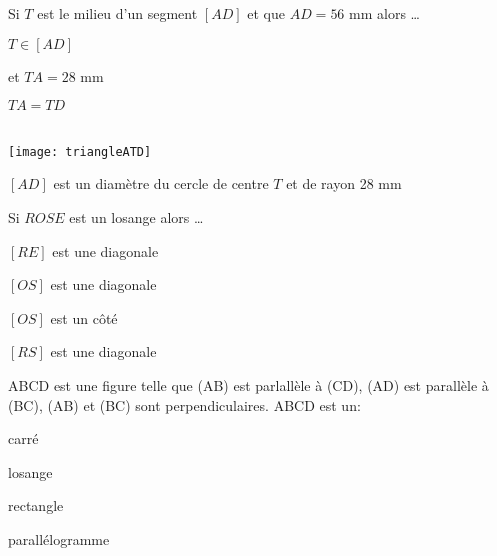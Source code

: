 

\begin{QCM}
  \begin{GroupeQCM}
    \begin{exercice}
      Si $T$ est le milieu d'un segment $[AD]$ et que $AD = 56$ mm alors \ldots
      \begin{ChoixQCM}{4}
      \item $T \in [AD]$
      
      et $TA = 28$ mm
      \item $TA = TD$
      \item \\[-1em]
      \texttt{[image: triangleATD]}
      \item $[AD]$ est un diamètre du cercle de centre $T$ et de rayon 28 mm
      \end{ChoixQCM}
\begin{corrige}
   \end{corrige}
    \end{exercice}

  \begin{exercice}
      Si $ROSE$ est un losange alors \ldots
      \begin{ChoixQCM}{4}
      \item $[RE]$ est une diagonale
      \item $[OS]$ est une diagonale
      \item $[OS]$ est un côté
      \item $[RS]$ est une diagonale
      \end{ChoixQCM}
\begin{corrige}
   \end{corrige}
    \end{exercice}

\begin{exercice}
      ABCD est une figure telle que (AB) est parlallèle à (CD), (AD) est parallèle à (BC), (AB) et (BC) sont perpendiculaires. ABCD est un:
      \begin{ChoixQCM}{4}
      \item carré
      \item losange
      \item rectangle
      \item parallélogramme
      \end{ChoixQCM}
\begin{corrige}
   \end{corrige}
    \end{exercice}


\end{GroupeQCM}
\end{QCM}
